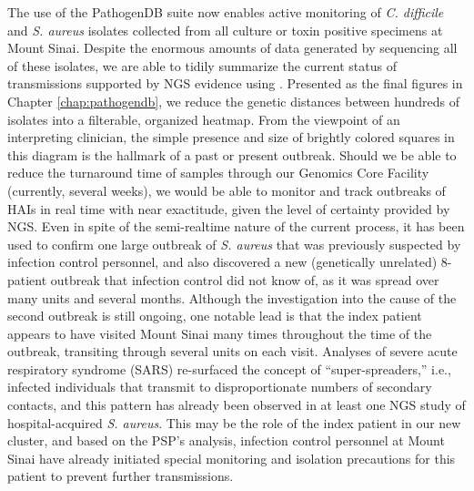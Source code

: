 The use of the PathogenDB suite now enables active monitoring of \emph{C. difficile} and \emph{S. aureus} isolates collected from all culture or toxin positive specimens at Mount Sinai. Despite the enormous amounts of data generated by sequencing all of these isolates, we are able to tidily summarize the current status of transmissions supported by NGS evidence using \pathogendbviz. Presented as the final figures in Chapter \ref{chap:pathogendb}, we reduce the genetic distances between hundreds of isolates into a filterable, organized heatmap. From the viewpoint of an interpreting clinician, the simple presence and size of brightly colored squares in this diagram is the hallmark of a past or present outbreak. Should we be able to reduce the turnaround time of samples through our Genomics Core Facility (currently, several weeks), we would be able to monitor and track outbreaks of HAIs in real time with near exactitude, given the level of certainty provided by NGS. Even in spite of the semi-realtime nature of the current process, it has been used to confirm one large outbreak of \emph{S. aureus} that was previously suspected by infection control personnel, and also discovered a new (genetically unrelated) 8-patient outbreak that infection control did not know of, as it was spread over many units and several months. Although the investigation into the cause of the second outbreak is still ongoing, one notable lead is that the index patient appears to have visited Mount Sinai many times throughout the time of the outbreak, transiting through several units on each visit. Analyses of severe acute respiratory syndrome (SARS) re-surfaced the concept of ``super-spreaders,'' i.e., infected individuals that transmit to disproportionate numbers of secondary contacts,\autocite{Stein2011} and this pattern has already been observed in at least one NGS study of hospital-acquired \emph{S. aureus}.\autocite{Tong2015} This may be the role of the index patient in our new cluster, and based on the PSP's analysis, infection control personnel at Mount Sinai have already initiated special monitoring and isolation precautions for this patient to prevent further transmissions.

